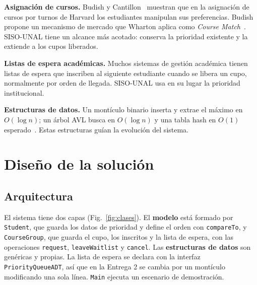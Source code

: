 \documentclass[conference]{IEEEtran}
\begin{document}
\textbf{Asignación de cursos.} Budish y Cantillon~\cite{budish2012} muestran que en la asignación de cursos por turnos de Harvard los estudiantes manipulan sus preferencias. Budish~\cite{budish2011} propone un mecanismo de mercado que Wharton aplica como \emph{Course Match}~\cite{budish2017}. SISO-UNAL tiene un alcance más acotado: conserva la prioridad existente y la extiende a los cupos liberados.

\textbf{Listas de espera académicas.} Muchos sistemas de gestión académica tienen listas de espera que inscriben al siguiente estudiante cuando se libera un cupo, normalmente por orden de llegada. SISO-UNAL usa en su lugar la prioridad institucional.

\textbf{Estructuras de datos.} Un montículo binario inserta y extrae el máximo en $O(\log n)$; un árbol AVL busca en $O(\log n)$ y una tabla hash en $O(1)$ esperado~\cite{cormen,goodrich}. Estas estructuras guían la evolución del sistema.


\section{Diseño de la solución}

\subsection{Arquitectura}
El sistema tiene dos capas (Fig.~\ref{fig:clases}). El \textbf{modelo} está formado por \texttt{Student}, que guarda los datos de prioridad y define el orden con \texttt{compareTo}, y \texttt{CourseGroup}, que guarda el cupo, los inscritos y la lista de espera, con las operaciones \texttt{request}, \texttt{leaveWaitlist} y \texttt{cancel}. Las \textbf{estructuras de datos} son genéricas y propias. La lista de espera se declara con la interfaz \texttt{PriorityQueueADT}, así que en la Entrega 2 se cambia por un montículo modificando una sola línea. \texttt{Main} ejecuta un escenario de demostración.
\end{document}
